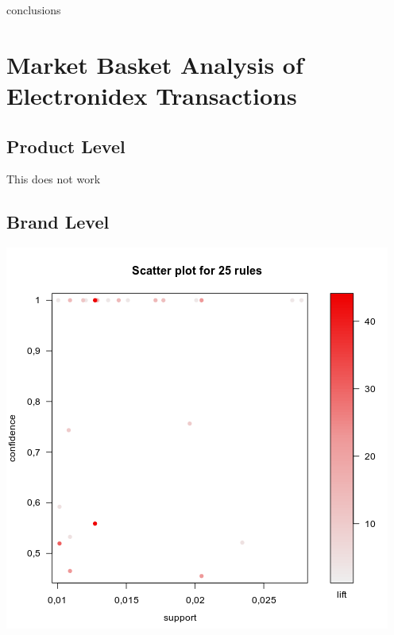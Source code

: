 \documentclass[12pt,a4paper,leqno]{report}
\theoremstyle{plain}
\theoremstyle{definition}
\theoremstyle{remark}
\begin{document}
conclusions

\section{Market Basket Analysis of Electronidex Transactions}

\subsection{Product Level}

This does not work

\subsection{Brand Level}

\bigskip
{
    \centering
    \includegraphics[width=\textwidth,height=\textheight,keepaspectratio]{apriori_brand_level_plot.png}
    \par
}
\bigskip
\end{document}
